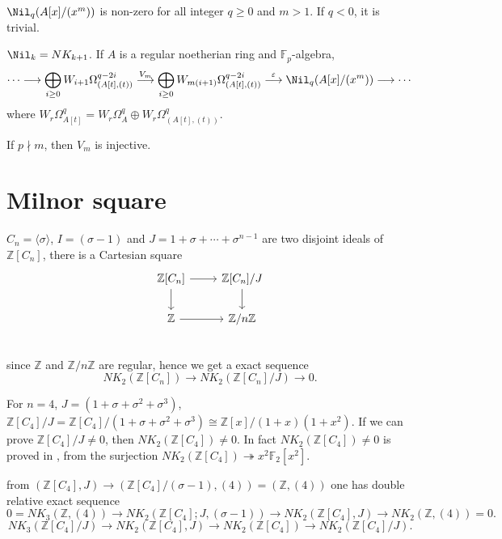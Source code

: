 $\Nil_q(A[x]/(x^m))$ is non-zero for all integer $q\geq 0$ and $m>1$. If $q<0$, it is trivial.

$\Nil_k=NK_{k+1}$. If $A$ is a regular noetherian ring and $\mathbb{F}_{p}$-algebra,
\[\cdots\longrightarrow \bigoplus_{i\geq 0}W_{i+1}\Omega_{(A[t],(t))}^{q-2i} \overset{V_m}\longrightarrow \bigoplus_{i\geq 0}W_{m(i+1)}\Omega_{(A[t],(t))}^{q-2i} \overset{\varepsilon}\longrightarrow \Nil_q(A[x]/(x^m))\longrightarrow \cdots \]
where $W_{r}\Omega_{A[t]}^{q}=W_{r}\Omega_{A}^{q}\oplus W_{r}\Omega_{(A[t],(t))}^{q}$.

If $p\nmid m$, then $V_m$ is injective.






\section{Milnor square}
$C_n=\langle \sigma \rangle$,  $I=(\sigma -1)$ and $J=1+\sigma+\cdots+\sigma^{n-1}$ are two disjoint ideals of $\mathbb{Z}[C_n]$, there is a Cartesian square
\begin{equation*}
	\begin{tikzcd}
		\mathbb{Z}[C_n] \ar[r] \ar[d]& \mathbb{Z}[C_n]/J\ar[d]\\
		 \mathbb{Z}\ar[r] & \mathbb{Z}/n\mathbb{Z}\\
	\end{tikzcd}
\end{equation*}
since $\mathbb{Z}$ and  $\mathbb{Z}/n\mathbb{Z}$ are regular, hence we get a exact sequence
\[NK_2(\mathbb{Z}[C_n])\longrightarrow NK_2(\mathbb{Z}[C_n]/J)\longrightarrow 0.\] 

For $n=4$, $J=(1+\sigma+\sigma^2+\sigma^3)$, $\mathbb{Z}[C_4]/J=\mathbb{Z}[C_4]/(1+\sigma+\sigma^2+\sigma^3)\cong \mathbb{Z}[x]/(1+x)(1+x^2)$. If we can prove $\mathbb{Z}[C_4]/J\neq 0$, then $NK_2(\mathbb{Z}[C_4])\neq 0$. In fact $NK_2(\mathbb{Z}[C_4])\neq 0$ is proved in \cite{weibel2009nk0}, from the surjection $NK_2(\mathbb{Z}[C_4])\twoheadrightarrow x^2\mathbb{F}_2[x^2]$.

from $(\mathbb{Z}[C_4],J)\longrightarrow (\mathbb{Z}[C_4]/(\sigma-1),(4))=(\mathbb{Z},(4))$ one has double relative exact sequence
\[0=NK_3(\mathbb{Z},(4))\longrightarrow NK_2(\mathbb{Z}[C_4];J,(\sigma-1)) \longrightarrow NK_2(\mathbb{Z}[C_4],J)\longrightarrow NK_2(\mathbb{Z},(4))=0.\]
\[NK_3(\mathbb{Z}[C_4]/J)\longrightarrow NK_2(\mathbb{Z}[C_4],J)\longrightarrow NK_2(\mathbb{Z}[C_4])\longrightarrow NK_2(\mathbb{Z}[C_4]/J).\]

